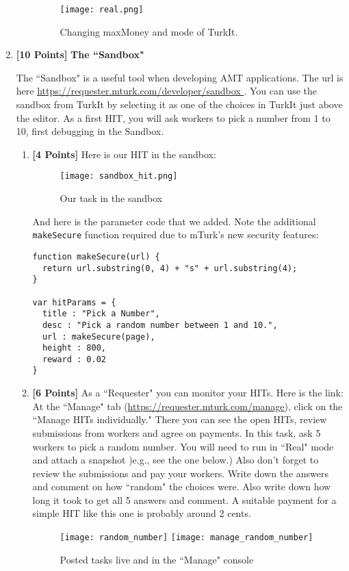 \documentclass[11pt]{article}
\newcommand{\points}[1]{\textbf{[#1 Points]}}
\begin{document}
\begin{enumerate}
\begin{enumerate}
\begin{figure}[!h]
\centering
\texttt{[image: real.png]}
\caption{Changing maxMoney and mode of TurkIt.}
\label{fig:mode_real}
\end{figure}
\end{enumerate}


\item \points{10} {\bf The ``Sandbox"}

The ``Sandbox" is a useful tool when developing AMT applications.
The url is here \url{https://requester.mturk.com/developer/sandbox
}. You can use the sandbox from TurkIt by selecting it as one of
the choices in TurkIt just above the editor.
As a first HIT, you will ask workers to pick
a number from 1 to 10, first debugging in the Sandbox.
%
\begin{enumerate}
\item \points{4}
Here is our HIT in the sandbox:
%
\begin{figure}[h]
\begin{center}
\texttt{[image: sandbox\_hit.png]}
\end{center}
\caption{Our task in the sandbox}
\end{figure}
%
And here is the parameter code that we added. Note the additional \texttt{makeSecure} function required due to mTurk's new security features:
\begin{lstlisting}
function makeSecure(url) {
  return url.substring(0, 4) + "s" + url.substring(4);
}

var hitParams = {
  title : "Pick a Number",
  desc : "Pick a random number between 1 and 10.",
  url : makeSecure(page),
  height : 800,
  reward : 0.02
}
\end{lstlisting}

\item \points{6} 
As a ``Requester" you can monitor your HITs. Here is the link:
At the ``Manage" tab (\url{https://requester.mturk.com/manage}), click on the 
``Manage HITs individually." 
There you can see the open HITs, review submissions from workers and 
agree on payments. In this task, ask 5 workers to pick a random number. You will need to run in ``Real" mode
and attach a snapshot )e.g., see the one below.) 
Also don't forget to review the submissions and pay your workers.
Write down the answers and comment on how ``random" the choices were. Also write down how long it took
to get all 5 answers and comment. A suitable payment for
a simple HIT like this one is probably around 2 cents.
%
\begin{figure}[h]
\begin{center}
\texttt{[image: random\_number]}
\texttt{[image: manage\_random\_number]}
\end{center}
\caption{Posted tasks live and in the ``Manage" console}
\end{figure}


\end{enumerate}
\end{enumerate}
\end{document}
